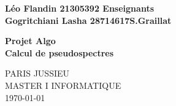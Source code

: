 \documentclass[11pt]{article}
\begin{document}
\noindent
\textbf{ \large{Léo Flandin 21305392    \hfill Enseignants }}\\
\textbf{\large{Gogritchiani Lasha 28714617\hfill S.Graillat}} 
    \vspace*{7cm}
    
    \begin{center}
        \textbf{\Large{Projet Algo} }\\
        \vspace*{1 cm}
    \Huge{\textbf{ Calcul de pseudospectres}}\\
    \end{center}
    \vspace{4cm}
    
    \vfill

    \begin{center}
    \large{PARIS JUSSIEU}\\[0.25cm]
    \large {MASTER I INFORMATIQUE }\\[0.25cm]
    \large{\today}
  \end{center}

  
\end{document}
